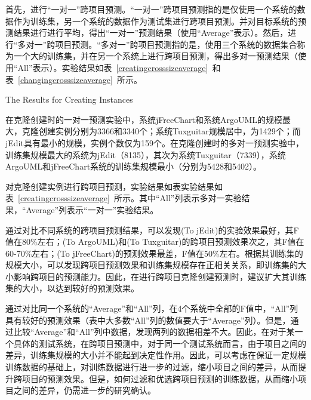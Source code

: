 首先，进行“一对一”跨项目预测。“一对一”跨项目预测指的是仅使用一个系统的数据作为训练集，另一个系统的数据作为测试集进行跨项目预测。并对目标系统的预测结果进行进行平均，得出“一对一”预测结果（使用“Average”表示）。然后，进行“多对一”跨项目预测。“多对一”跨项目预测指的是，使用三个系统的数据集合称为一个大的训练集，并在另一个系统上进行跨项目预测，得出多对一预测结果（使用“All”表示）。实验结果如表~\ref{creatingcrosssizeaverage}~和表~\ref{changingcrosssizeaverage}~所示。

{The Results for Creating Instances}

在克隆创建时的一对一预测实验中，系统jFreeChart和系统ArgoUML的规模最大，克隆创建实例分别为3366和3340个；系统Tuxguitar规模居中，为1429个；而jEdit具有最小的规模，实例个数仅为159个。在克隆创建时的多对一预测实验中，训练集规模最大的系统为jEdit（8135），其次为系统Tuxguitar（7339），系统ArgoUML和jFreeChart系统的训练集规模最小（分别为5428和5402）。

对克隆创建实例进行跨项目预测，实验结果如表实验结果如表~\ref{creatingcrosssizeaverage}~所示。其中“All”列表示多对一实验结果，“Average”列表示“一对一”实验结果。

通过对比不同系统的跨项目预测结果，可以发现(To jEdit)的实验效果最好，其F值在80\%左右；(To ArgoUML)和(To Tuxguitar)的跨项目预测效果次之，其F值在60-70\%左右；(To jFreeChart)的预测效果最差，F值在50\%左右。根据其训练集的规模大小，可以发现跨项目预测效果和训练集规模存在正相关关系，即训练集的大小影响跨项目的预测能力。因此，在进行跨项目克隆创建预测时，建议扩大其训练集的大小，以达到较好的预测效果。%

通过对比同一个系统的“Average”和“All”列，在4个系统中全部的F值中，“All”列具有较好的预测效果（表中大多数“All”列的数值要大于“Average”列）。但是，通过比较“Average”和“All”列中数据，发现两列的数据相差不大。因此，在对于某一个具体的测试系统，在跨项目预测中，对于同一个测试系统而言，由于项目之间的差异，训练集规模的大小并不能起到决定性作用。因此，可以考虑在保证一定规模训练数据的基础上，对训练数据进行进一步的过滤，缩小项目之间的差异，从而提升跨项目的预测效果。但是，如何过滤和优选跨项目预测的训练数据，从而缩小项目之间的差异，仍需进一步的研究确认。

